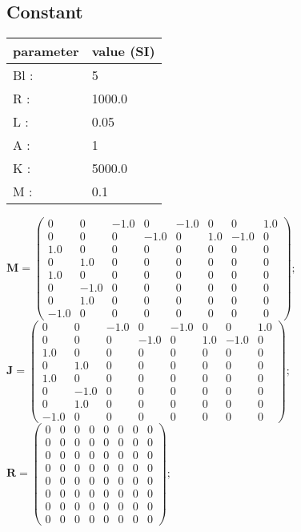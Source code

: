 \documentclass[11pt, oneside]{article}      %
\begin{document}
\subsection{Constant}
%
\begin{center}
%
\begin{tabular}{ll}
%
\hline
parameter & value (SI)
\\ \hline
Bl :& 5
\\
R :& 1000.0
\\
L :& 0.05
\\
A :& 1
\\
K :& 5000.0
\\
M :& 0.1
\\
\hline
\end{tabular}
%
\end{center}
%
$ \mathbf{M} = \left(\begin{array}{cccccccc}0 & 0 & -1.0 & 0 & -1.0 & 0 & 0 & 1.0\\0 & 0 & 0 & -1.0 & 0 & 1.0 & -1.0 & 0\\1.0 & 0 & 0 & 0 & 0 & 0 & 0 & 0\\0 & 1.0 & 0 & 0 & 0 & 0 & 0 & 0\\1.0 & 0 & 0 & 0 & 0 & 0 & 0 & 0\\0 & -1.0 & 0 & 0 & 0 & 0 & 0 & 0\\0 & 1.0 & 0 & 0 & 0 & 0 & 0 & 0\\-1.0 & 0 & 0 & 0 & 0 & 0 & 0 & 0\end{array}\right) ; $ 
%
\\
%
$ \mathbf{J} = \left(\begin{array}{cccccccc}0 & 0 & -1.0 & 0 & -1.0 & 0 & 0 & 1.0\\0 & 0 & 0 & -1.0 & 0 & 1.0 & -1.0 & 0\\1.0 & 0 & 0 & 0 & 0 & 0 & 0 & 0\\0 & 1.0 & 0 & 0 & 0 & 0 & 0 & 0\\1.0 & 0 & 0 & 0 & 0 & 0 & 0 & 0\\0 & -1.0 & 0 & 0 & 0 & 0 & 0 & 0\\0 & 1.0 & 0 & 0 & 0 & 0 & 0 & 0\\-1.0 & 0 & 0 & 0 & 0 & 0 & 0 & 0\end{array}\right) ; $ 
%
\\
%
$ \mathbf{R} = \left(\begin{array}{cccccccc}0 & 0 & 0 & 0 & 0 & 0 & 0 & 0\\0 & 0 & 0 & 0 & 0 & 0 & 0 & 0\\0 & 0 & 0 & 0 & 0 & 0 & 0 & 0\\0 & 0 & 0 & 0 & 0 & 0 & 0 & 0\\0 & 0 & 0 & 0 & 0 & 0 & 0 & 0\\0 & 0 & 0 & 0 & 0 & 0 & 0 & 0\\0 & 0 & 0 & 0 & 0 & 0 & 0 & 0\\0 & 0 & 0 & 0 & 0 & 0 & 0 & 0\end{array}\right) ; $ 
%
\\
%
\end{document}
